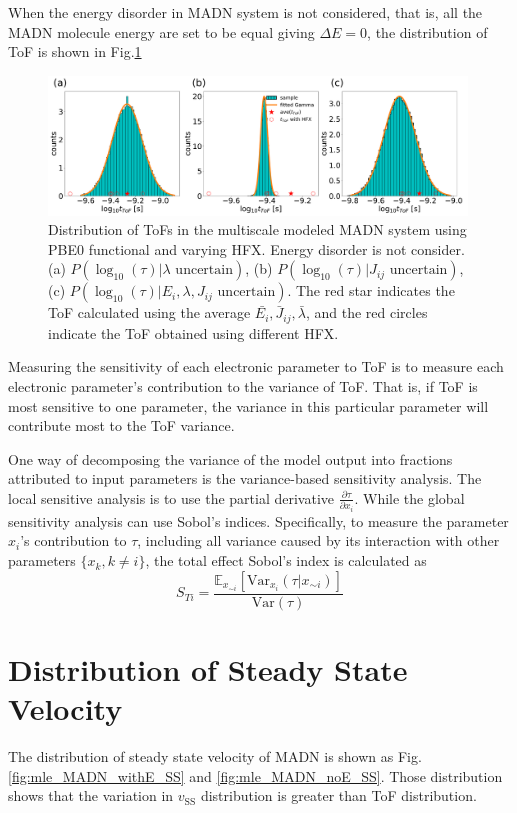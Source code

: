 \documentclass[letterpaper,12pt]{article}
\begin{document}
When the energy disorder in MADN system is not considered, that is, all the MADN molecule energy are set to be equal giving $\Delta E=0$, the distribution of ToF is shown in Fig.\ref{fig:mle_MADN_noE}
%
\begin{figure}[H]
    \centering
    \includegraphics[width=0.99\textwidth]{figs/MADN_HFX/fig_mle_MADN_noE.pdf}
    \caption{Distribution of ToFs in the multiscale modeled MADN system using PBE0 functional and varying HFX. Energy disorder is not consider. 
    (a) $P(\log_{10}(\tau)|\lambda \text{ uncertain})$, 
    (b) $P(\log_{10}(\tau)|J_{ij} \text{ uncertain})$, 
    (c) $P(\log_{10}(\tau)|E_i, \lambda, J_{ij} \text{ uncertain})$. The red star indicates the ToF calculated using the average $\bar{E_i}, \bar{J}_{ij}, \bar{\lambda}$, and the red circles indicate the ToF obtained using different HFX.}
    \label{fig:mle_MADN_noE}
\end{figure}
%


Measuring the sensitivity of each electronic parameter to ToF is to measure each electronic parameter's contribution to the variance of ToF. 
That is, if ToF is most sensitive to one parameter, the variance in this particular parameter will contribute most to the ToF variance. 

One way of decomposing the variance of the model output into fractions attributed to input parameters is the variance-based sensitivity analysis. The local sensitive analysis is to use the partial derivative $\frac{\partial \tau}{\partial x_i}$. While the global sensitivity analysis can use Sobol's indices. Specifically, to measure the parameter $x_i$'s contribution to $\tau$, including all variance caused by its interaction with other parameters $\{x_k, k \neq i \}$, the total effect Sobol's index is calculated as 
\begin{equation}
    S_{Ti} = \frac{ \mathbb{E}_{x_{\sim i}}[ \text{Var}_{x_i}(\tau|x_{\sim i}) ] }{ \text{Var}(\tau) }
    \label{eq:STi}
\end{equation}



\section{Distribution of Steady State Velocity}
The distribution of steady state velocity of MADN is shown as Fig.\ref{fig:mle_MADN_withE_SS} and \ref{fig:mle_MADN_noE_SS}. 
Those distribution shows that the variation in $v_\text{SS}$ distribution is greater than ToF distribution. 
\end{document}

